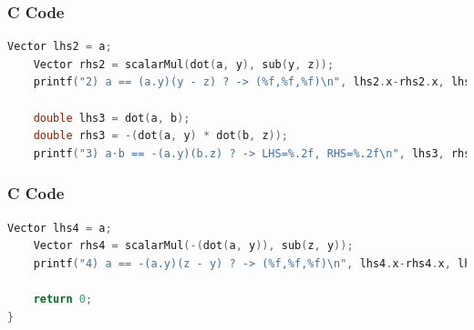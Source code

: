 \documentclass{beamer}
\theoremstyle{remark}
\numberwithin{equation}{section}
\begin{document}
\begin{frame}[fragile]
\frametitle{C Code }
\begin{lstlisting}[language=C]
   Vector lhs2 = a;
    Vector rhs2 = scalarMul(dot(a, y), sub(y, z));
    printf("2) a == (a.y)(y - z) ? -> (%f,%f,%f)\n", lhs2.x-rhs2.x, lhs2.y-rhs2.y, lhs2.z-rhs2.z);

    double lhs3 = dot(a, b);
    double rhs3 = -(dot(a, y) * dot(b, z));
    printf("3) a·b == -(a.y)(b.z) ? -> LHS=%.2f, RHS=%.2f\n", lhs3, rhs3);

\end{lstlisting}
\end{frame}
\begin{frame}[fragile]
\frametitle{C Code }
\begin{lstlisting}[language=C]
  Vector lhs4 = a;
    Vector rhs4 = scalarMul(-(dot(a, y)), sub(z, y));
    printf("4) a == -(a.y)(z - y) ? -> (%f,%f,%f)\n", lhs4.x-rhs4.x, lhs4.y-rhs4.y, lhs4.z-rhs4.z);

    return 0;
}
\end{lstlisting}
\end{frame}
\end{document}
